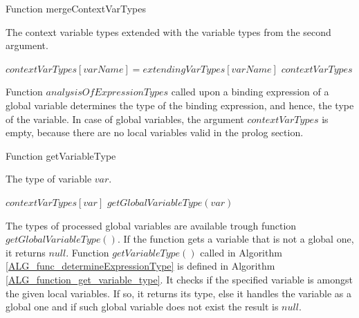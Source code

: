 

\begin{algorithm}
\caption{Function mergeContextVarTypes}
\label{ALG_function_mergeContextVarTypes}
\begin{algorithmic}[1]
\ENSURE The context variable types extended with the variable types from the second argument.

    \STATE $contextVarTypes[varName] = extendingVarTypes[varName]$
\ENDFOR
\RETURN $contextVarTypes$
\end{algorithmic}
\end{algorithm}

Function $analysisOfExpressionTypes$ called upon a binding expression of a global variable determines the type of the binding expression, and hence, the type of the variable. In case of global variables, the argument $contextVarTypes$ is empty, because there are no local variables valid in the prolog section.

\begin{algorithm}
\caption{Function getVariableType}
\label{ALG_function_get_variable_type}
\begin{algorithmic}[1]
\ENSURE The type of variable $var$.

     \RETURN $contextVarTypes[var]$
\ELSE
     \RETURN $getGlobalVariableType(var)$
\ENDIF
\end{algorithmic}
\end{algorithm}

The types of processed global variables are available trough function $getGlobalVariableType()$. If the function gets a variable that is not a global one, it returns $null$. Function $getVariableType()$ called in Algorithm \ref{ALG_func_determineExpressionType} is defined in Algorithm \ref{ALG_function_get_variable_type}. It checks if the specified variable is amongst the given local variables. If so, it returns its type, else it handles the variable as a global one and if such global variable does not exist the result is $null$.

